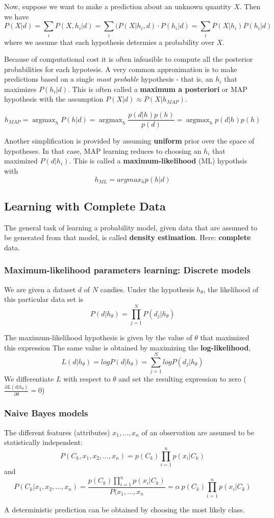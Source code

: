 \documentclass{scrartcl}
\DeclareMathOperator*{\argmax}{argmax} %
\begin{document}
Now, suppose we want to make a prediction about an unknown quantity \(X\). Then we have
\[P(X|d) =\sum_iP(X, h_i | d) = \sum_i(P(X | h_i, d) \cdot P(h_i | d) = \sum_i P(X|h_i) P(h_i|d)\]
where we assume that each hypothesis determies a probability over \(X\).

Because of computational cost it is often infeasible to compute all the posterior probabilities for each hypotesis. A very common approximation is to make predictions based on a single \textit{most probable} hypothesis - that is, an \(h_i\) that maximizes \(P(h_i|d)\). This is often called a \textbf{maximum a posteriori} or MAP hypothesis with the assumption \(P(X|d) \approx P(X|h_{MAP})\).

\[h_{MAP} = \argmax_{h} P(h|d) = \argmax_{h} \frac{p(d|h) p(h)}{p(d)} = \argmax_{h} p(d|h) p(h)\]

Another simplification is provided by assuming \textbf{uniform} prior over the space of hypotheses. In that case, MAP learning reduces to choosing an \(h_i\) that maximized \(P(d|h_i)\). This is called a \textbf{maximum-likelihood} (ML) hypothsis with
\[h_{ML} = argmax_h p(h|d)\]

\subsection{Learning with Complete Data}
The general task of learning a probability model, given data that are assumed to be generated from that model, is called \textbf{density estimation}. Here: \textbf{complete} data.

\subsubsection{Maximum-likelihood parameters learning: Discrete models}
We are given a dataset \(d\) of \(N\) candies. Under the hypothesis \(h_{\theta}\), the likelihood of this particular data set is
\[P(d|h_{\theta}) = \prod_{j=1}^N P(d_j| h_{\theta})\]

The maximum-likelihood hypothesis is given by the value of \(\theta\) that maximized this expression The same value is obtained by maximizing the \textbf{log-likelihood},
\[L(d|h_{\theta}) = log P(d | h_{\theta}) = \sum_{j=1}^N log P(d_j | h_{\theta})\]
We differentiate \(L\) with respect to \(\theta\) and set the resulting expression to zero (\(\frac{\partial L(d|h_{\theta})}{\partial \theta} = 0\))

\subsubsection{Naive Bayes models}
The different features (attributes) \(x_1, \dots, x_n\) of an observation are assumed to be statistically independent:
\[P(C_k, x_1, x_2, \dots, x_n) = p(C_k) \prod_{i=1}^n p(x_i | C_k) \]
and
\[P(C_k | x_1, x_2, \dots, x_n) = \frac{p(C_k) \prod_{i=1}^n p(x_i | C_k)}{P(x_1, \dots, x_n} = \alpha \ p(C_k) \prod_{i=1}^n p(x_i | C_k) \]

A deterministic prediction can be obtained by choosing the most likely class.
\end{document}
